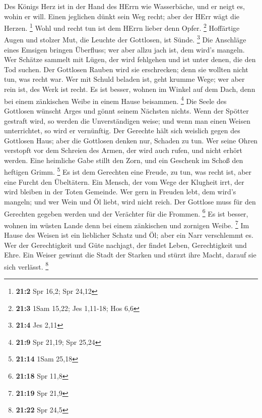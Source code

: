  Des Königs Herz ist in der Hand des HErrn wie
Wasserbäche, und er neigt es, wohin er will.  Einen
jeglichen dünkt sein Weg recht; aber der HErr wägt die Herzen.
\footnote{\textbf{21:2} Spr 16,2; Spr 24,12}  Wohl und
recht tun ist dem HErrn lieber denn Opfer. \footnote{\textbf{21:3} 1Sam
  15,22; Jes 1,11-18; Hos 6,6}  Hoffärtige Augen und
stolzer Mut, die Leuchte der Gottlosen, ist Sünde. \footnote{\textbf{21:4}
  Jes 2,11}  Die Anschläge eines Emsigen bringen
Überfluss; wer aber allzu jach ist, dem wird's mangeln. 
Wer Schätze sammelt mit Lügen, der wird fehlgehen und ist unter denen,
die den Tod suchen.  Der Gottlosen Rauben wird sie
erschrecken; denn sie wollten nicht tun, was recht war. 
Wer mit Schuld beladen ist, geht krumme Wege; wer aber rein ist, des
Werk ist recht.  Es ist besser, wohnen im Winkel auf dem
Dach, denn bei einem zänkischen Weibe in einem Hause beisammen.
\footnote{\textbf{21:9} Spr 21,19; Spr 25,24}  Die Seele
des Gottlosen wünscht Arges und gönnt seinem Nächsten nichts.
 Wenn der Spötter gestraft wird, so werden die
Unverständigen weise; und wenn man einen Weisen unterrichtet, so wird er
vernünftig.  Der Gerechte hält sich weislich gegen des
Gottlosen Haus; aber die Gottlosen denken nur, Schaden zu tun.
 Wer seine Ohren verstopft vor dem Schreien des Armen,
der wird auch rufen, und nicht erhört werden.  Eine
heimliche Gabe stillt den Zorn, und ein Geschenk im Schoß den heftigen
Grimm. \footnote{\textbf{21:14} 1Sam 25,18}  Es ist dem
Gerechten eine Freude, zu tun, was recht ist, aber eine Furcht den
Übeltätern.  Ein Mensch, der vom Wege der Klugheit irrt,
der wird bleiben in der Toten Gemeinde.  Wer gern in
Freuden lebt, dem wird's mangeln; und wer Wein und Öl liebt, wird nicht
reich.  Der Gottlose muss für den Gerechten gegeben
werden und der Verächter für die Frommen. \footnote{\textbf{21:18} Spr
  11,8}  Es ist besser, wohnen im wüsten Lande denn bei
einem zänkischen und zornigen Weibe. \footnote{\textbf{21:19} Spr 21,9}
 Im Hause des Weisen ist ein lieblicher Schatz und Öl;
aber ein Narr verschlemmt es.  Wer der Gerechtigkeit und
Güte nachjagt, der findet Leben, Gerechtigkeit und Ehre. 
Ein Weiser gewinnt die Stadt der Starken und stürzt ihre Macht, darauf
sie sich verlässt. \footnote{\textbf{21:22} Spr 24,5} 
